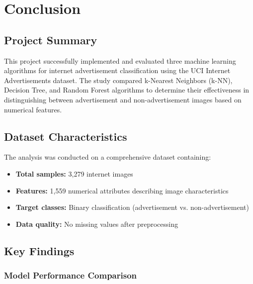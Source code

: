 \section{Conclusion}
\label{sec:conclusion}

\subsection{Project Summary}

This project successfully implemented and evaluated three machine learning algorithms for internet advertisement classification using the UCI Internet Advertisements dataset. The study compared k-Nearest Neighbors (k-NN), Decision Tree, and Random Forest algorithms to determine their effectiveness in distinguishing between advertisement and non-advertisement images based on numerical features.

\subsection{Dataset Characteristics}

The analysis was conducted on a comprehensive dataset containing:
\begin{itemize}
    \item \textbf{Total samples:} 3,279 internet images
    \item \textbf{Features:} 1,559 numerical attributes describing image characteristics
    \item \textbf{Target classes:} Binary classification (advertisement vs. non-advertisement)
    \item \textbf{Data quality:} No missing values after preprocessing
\end{itemize}

\subsection{Key Findings}

\subsubsection{Model Performance Comparison}


